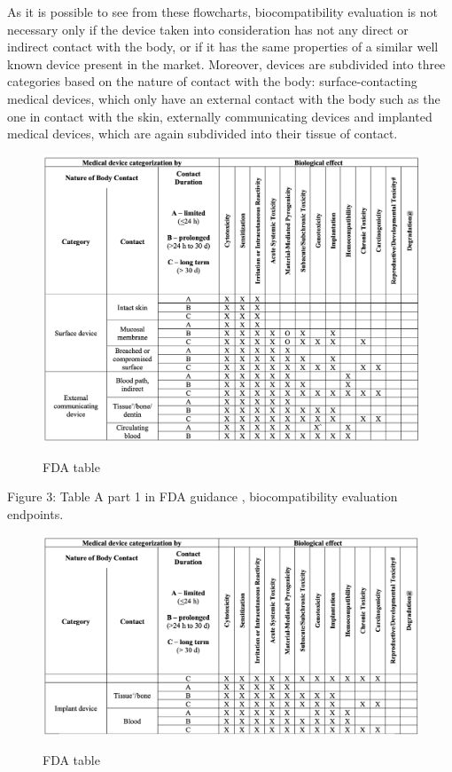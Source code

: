 \documentclass{Configuration_Files/PoliMi3i_thesis}
\begin{document}
As it is possible to see from these flowcharts, biocompatibility evaluation is not necessary only if the device taken into consideration has not any direct or indirect contact with the body, or if it has the same properties of a similar well known device present in the market.
Moreover, devices are subdivided into three categories based on the nature of contact with the body: surface-contacting medical devices, which only have an external contact with the body such as the one in contact with the skin, externally communicating devices and implanted medical devices, which are again subdivided into their tissue of contact.

\begin{figure}[H]
	\includegraphics[scale=0.3]{tab1_fda.png}
	\centering
    \label{tab_da_1}
    \caption{FDA table}
\end{figure}

Figure 3: Table A part 1 in FDA guidance \cite{healthUseInternationalStandard2023}, biocompatibility evaluation endpoints.

\begin{figure}[H]

	\includegraphics[scale=0.3]{tab2_fda.png}
	\centering
    \label{tab_da_2}
    \caption{FDA table}
\end{figure}
\end{document}
